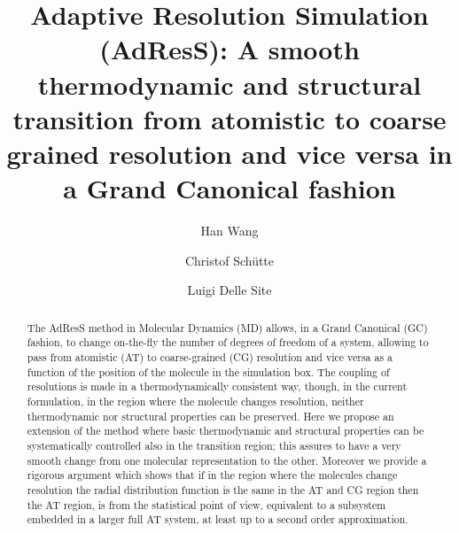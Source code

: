 \documentclass[aps,pre,preprint]{revtex4}
\begin{document}
\title{Adaptive Resolution Simulation (AdResS): A smooth thermodynamic and structural transition from atomistic to coarse grained resolution and vice versa in a Grand Canonical fashion}
\author{Han Wang}
\author{Christof Sch\"utte}
\author{Luigi Delle Site}


\begin{abstract}
The AdResS method in Molecular Dynamics (MD) allows, in a Grand Canonical (GC) fashion, to change on-the-fly the number of degrees of freedom of a system, allowing to pass from atomistic (AT) to coarse-grained (CG) resolution and vice versa as a function of the position of the molecule in the simulation box. The coupling of resolutions is made in a thermodynamically consistent way, though, in the current formulation, in the region where the molecule changes resolution, neither thermodynamic nor structural properties can be preserved. Here we propose an extension of the method where basic thermodynamic and structural properties can be systematically controlled also in the transition region; this assures to have a very smooth change from one molecular representation to the other. Moreover we provide a rigorous argument which shows that if in the region where the molecules change resolution the radial distribution function is the same in the AT and CG region then the AT region, is from the statistical point of view, equivalent to a subsystem embedded in a larger full AT system, at least up to a second order approximation.    
\end{abstract}

\maketitle
\end{document}
